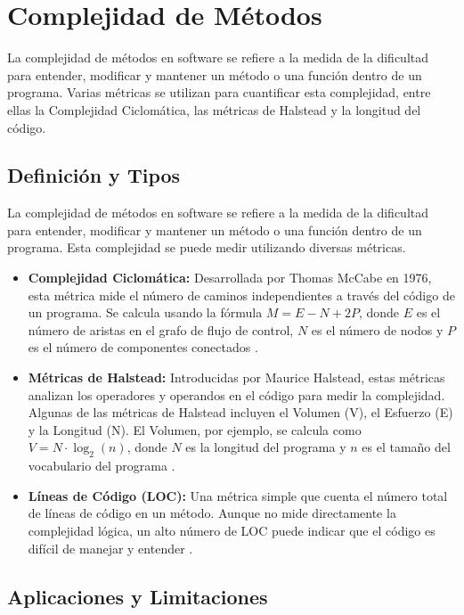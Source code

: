 \documentclass[a4,10pt]{article}
\begin{document}
\section{Complejidad de Métodos}

\hspace{0.6cm}La complejidad de métodos en software se refiere a la medida de la dificultad para entender, modificar y mantener un método o una función dentro de un programa. Varias métricas se utilizan para cuantificar esta complejidad, entre ellas la Complejidad Ciclomática, las métricas de Halstead y la longitud del código.

\subsection{Definición y Tipos}

\hspace{0.6cm}La complejidad de métodos en software se refiere a la medida de la dificultad para entender, modificar y mantener un método o una función dentro de un programa. Esta complejidad se puede medir utilizando diversas métricas.

\begin{itemize}
    \item \textbf{Complejidad Ciclomática:} Desarrollada por Thomas McCabe en 1976, esta métrica mide el número de caminos independientes a través del código de un programa. Se calcula usando la fórmula \( M = E - N + 2P \), donde \( E \) es el número de aristas en el grafo de flujo de control, \( N \) es el número de nodos y \( P \) es el número de componentes conectados \cite{ebert2016}.
    \item \textbf{Métricas de Halstead:} Introducidas por Maurice Halstead, estas métricas analizan los operadores y operandos en el código para medir la complejidad. Algunas de las métricas de Halstead incluyen el Volumen (V), el Esfuerzo (E) y la Longitud (N). El Volumen, por ejemplo, se calcula como \( V = N \cdot \log_2(n) \), donde \( N \) es la longitud del programa y \( n \) es el tamaño del vocabulario del programa \cite{wijendra2021}.
    \item \textbf{Líneas de Código (LOC):} Una métrica simple que cuenta el número total de líneas de código en un método. Aunque no mide directamente la complejidad lógica, un alto número de LOC puede indicar que el código es difícil de manejar y entender \cite{odeh2023}.
\end{itemize}

\subsection{Aplicaciones y Limitaciones}
\end{document}
